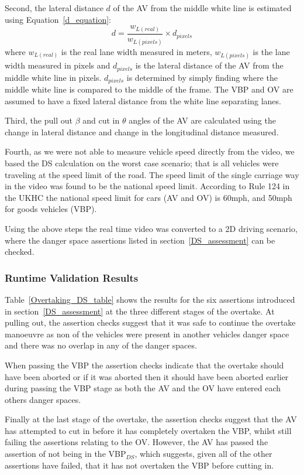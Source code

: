 Second, the lateral distance $d$ of the AV from the middle white line is estimated using Equation~\ref{d_equation}: 
%
\begin{equation}\label{d_equation}
    d = \frac{w_{L (real)}}{w_{L (pixels)}} \times d_{pixels}
\end{equation}
%
where $w_{L (real)}$ is the real lane width measured in meters, $w_{L (pixels)}$ is the lane width measured in pixels and $d_{pixels}$ is the lateral distance of the AV from the middle white line in pixels. 
%
$d_{pixels}$ is determined by simply finding where the middle white line is compared to the middle of the frame. 
%
The VBP and OV are assumed to have a fixed lateral distance from the white line separating lanes.

Third, the pull out $\beta$ and cut in $\theta$ angles of the AV are calculated using the change in lateral distance and change in the longitudinal distance measured.  

Fourth, as we were not able to measure vehicle speed directly from the video, we based the DS calculation on the worst case scenario; that is all vehicles were traveling at the speed limit of the road. 
%
The speed limit of the single carriage way in the video was found to be the national speed limit. 
%
According to Rule 124 in the UKHC the national speed limit for cars (AV and OV) is 60mph, and 50mph for goods vehicles (VBP).

Using the above steps the real time video was converted to a 2D driving scenario, where the danger space assertions listed in section~\ref{DS_assessment} can be checked.

\subsubsection{Runtime Validation Results}
Table~\ref{Overtaking_DS_table} shows the results for the six assertions introduced in section~\ref{DS_assessment} at the three different stages of the overtake.
%
At pulling out, the assertion checks suggest that it was safe to continue the overtake manoeuvre as non of the vehicles were present in another vehicles danger space and there was no overlap in any of the danger spaces.

When passing the VBP the assertion checks indicate that the overtake should have been aborted or if it was aborted then it should have been aborted earlier during passing the VBP stage as both the AV and the OV have entered each others danger spaces.

Finally at the last stage of the overtake, the assertion checks suggest that the AV has attempted to cut in before it has completely overtaken the VBP, whilst still failing the assertions relating to the OV. 
%
However, the AV has passed the assertion of not being in the VBP$_{DS}$, which suggests, given all of the other assertions have failed, that it has not overtaken the VBP before cutting in.

